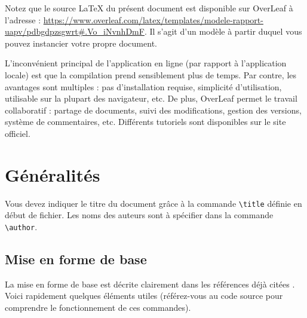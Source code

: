 \documentclass{ceri}
\begin{document}
Notez que le source \LaTeX{}  du présent document est disponible sur OverLeaf à l'adresse : \url{https://www.overleaf.com/latex/templates/modele-rapport-uapv/pdbgdpzsgwrt\#.Vo_iNvnhDmF}. Il s'agit d'un modèle à partir duquel vous pouvez instancier votre propre document.

L'inconvénient principal de l'application en ligne (par rapport à l'application locale) est que la compilation prend sensiblement plus de temps. Par contre, les avantages sont multiples :  pas d'installation requise, simplicité d'utilisation, utilisable sur la plupart des navigateur, etc. De plus, OverLeaf permet le travail collaboratif : partage de documents, suivi des modifications, gestion des versions, système de commentaires, etc. Différents tutoriels sont disponibles sur le site officiel.



\section{Généralités}
Vous devez indiquer le titre du document grâce à la commande \texttt{\textbackslash{}title} définie en début de fichier. Les noms des auteurs sont à spécifier dans la commande \texttt{\textbackslash{}author}.
		
\subsection{Mise en forme de base}
\label{sec:miseenforme}
La mise en forme de base est décrite clairement dans les références déjà citées \cite{Wikibooks2010, Wikibooks2011}. Voici rapidement quelques éléments utiles (référez-vous au code source pour comprendre le fonctionnement de ces commandes).
	
\end{document}
